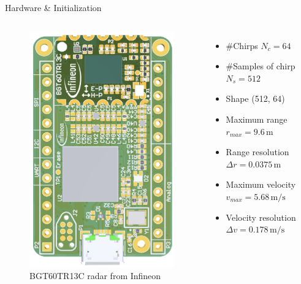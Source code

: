 \documentclass{beamer}
\begin{document}
\begin{frame}[t]{Hardware \& Initialization}
	\begin{columns}[t,onlytextwidth]
            \begin{figure}
                \vspace{-0.3\baselineskip}
                \centering
                \hspace{-0.5cm}
                \includegraphics[scale=.55]{MA_presentation/figures/radar_hardware.png}
                \caption{BGT60TR13C radar from Infineon \cite{ag_bgt60tr13c_nodate}}
            \end{figure}
		\begin{itemize}
            \vspace{0.6\baselineskip}
			\item \#Chirps $N_c = 64$
			\item \#Samples of chirp $N_s=512$
            \item Shape (512, 64)
			\item Maximum range $r_{max} = 9.6\,\mathrm{m}$
            \item Range resolution $\Delta r = 0.0375\,\mathrm{m}$
			\item Maximum velocity $v_{max} = 5.68\,\mathrm{m/s}$
			\item Velocity resolution $\Delta v = 0.178\,\mathrm{m/s}$
		\end{itemize}	
	\end{columns}	
\end{frame}
\end{document}
